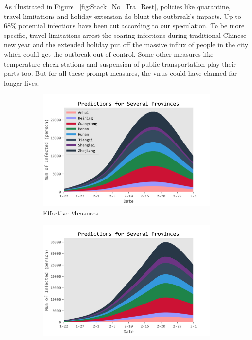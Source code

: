 \documentclass[12pt]{mcmthesis}
\begin{document}
    As illustrated in Figure ~\ref{fig:Stack_No_Tra_Rest}, policies like quarantine, travel limitations and holiday extension do blunt the outbreak's impacts. Up to 68\% potential infections have been cut according to our speculation. To be more specific, travel limitations arrest the soaring infections during traditional Chinese new year and the extended holiday put off the massive influx of people in the city which could get the outbreak out of control. Some other measures like temperature check stations and suspension of public transportation play their parts too. But for all these prompt measures, the virus could have claimed far longer lives.

\begin{figure}[H]
    \centering
    \begin{subfigure}[b]{0.3\textwidth}
        \includegraphics[width=\textwidth]{figure/Stack_Province.png}
        \caption{\small{Effective Measures}}
        \label{fig:Stack_Both}
    \end{subfigure}%
    \begin{subfigure}[b]{0.3\textwidth}
        \includegraphics[width=\textwidth]{figure/Stack_Province_No_Holiday.png}

\end{subfigure}
\end{figure}
\end{document}
